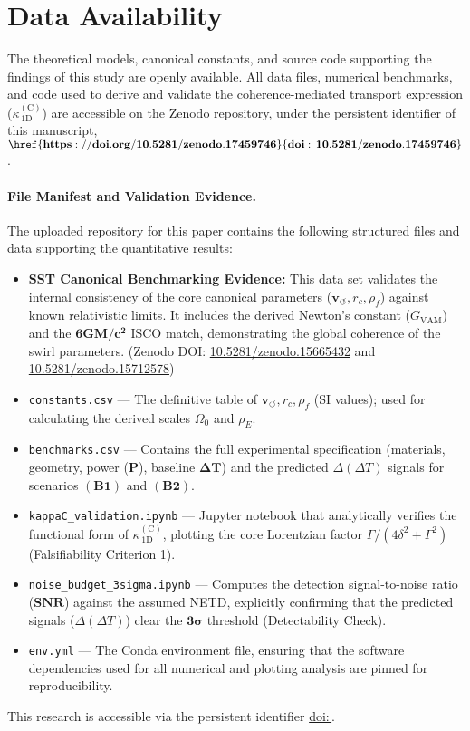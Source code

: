\documentclass[aps,prb,preprint,amsmath,amssymb]{revtex4-2} %
\providecommand{\doi}[1]{\href{https://doi.org/#1}{doi:\,#1}}
\begin{document}
    \section*{Data Availability}

        The theoretical models, canonical constants, and source code supporting the findings of this study are openly available. All data files, numerical benchmarks, and code used to derive and validate the coherence-mediated transport expression ($\kappa^{(\mathrm C)}_{\!\,1\mathrm D}$) are accessible on the Zenodo repository, under the persistent identifier of this manuscript, $\mathbf{\doi{\paperdoi}}$.

        \paragraph*{File Manifest and Validation Evidence.}
            The uploaded repository for this paper contains the following structured files and data supporting the quantitative results:
            \begin{itemize}
                \item \textbf{SST Canonical Benchmarking Evidence:} This data set validates the internal consistency of the core canonical parameters ($\mathbf{v}_{\!\boldsymbol{\circlearrowleft}}, r_c, \rho_{\!f}$) against known relativistic limits. It includes the derived Newton's constant ($G_{\mathrm{VAM}}$) and the $\mathbf{6GM/c^2}$ ISCO match, demonstrating the global coherence of the swirl parameters. \newline (Zenodo DOI: \url{10.5281/zenodo.15665432} and \url{10.5281/zenodo.15712578})

                \item \texttt{constants.csv} — The definitive table of $\mathbf{v}_{\!\boldsymbol{\circlearrowleft}}, r_c, \rho_{\!f}$ (SI values); used for calculating the derived scales $\Omega_0$ and $\rho_{\!E}$.
                \item \texttt{benchmarks.csv} — Contains the full experimental specification (materials, geometry, power ($\mathbf{P}$), baseline $\mathbf{\Delta T}$) and the predicted $\Delta(\Delta T)$ signals for scenarios $\mathbf{(B1)}$ and $\mathbf{(B2)}$.
                \item \texttt{kappaC\_validation.ipynb} — Jupyter notebook that analytically verifies the functional form of $\kappa^{(\mathrm C)}_{\!\,1\mathrm D}$, plotting the core Lorentzian factor $\Gamma/(4\delta^2+\Gamma^2)$ (Falsifiability Criterion 1).
                \item \texttt{noise\_budget\_3sigma.ipynb} — Computes the detection signal-to-noise ratio ($\mathbf{SNR}$) against the assumed NETD, explicitly confirming that the predicted signals ($\Delta(\Delta T)$) clear the $\mathbf{3\sigma}$ threshold (Detectability Check).
                \item \texttt{env.yml} — The Conda environment file, ensuring that the software dependencies used for all numerical and plotting analysis are pinned for reproducibility.
            \end{itemize}
        This research is accessible via the persistent identifier \doi{\paperdoi}.
\end{document}
